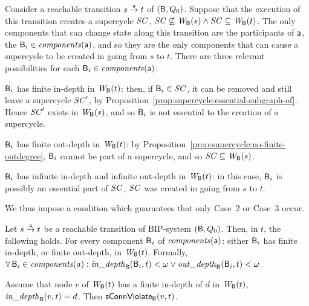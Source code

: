 Consider a reachable transition
$s \la{\act} t$ of $(\B, Q_0)$. Suppose that the execution of 
this transition creates a supercycle $\SC$, \ie $\SC \not\sub \wfg{\B}{s} \land \SC \sub
\wfg{\B}{t}$. The only components that can change state along this
transition are the participants of $\act$, \ie the $\B_i \in \cmps{\act}$, and so
they are the only components that can cause a supercycle to be created
in going from $s$ to $t$.
There are three relevant possibilities for each $\B_i \in \cmps{\act}$:
\bdn

\item[Case 1] \label{case:finite-in}
$\B_i$ has finite in-depth in $\wfg{\B}{t}$: then, if $\B_i \in
\SC$, it can be removed and still leave a supercycle $\SC'$, by
Proposition~\ref{prop:supercycle:essential-subgraph-of}. Hence 
$\SC'$ exists in $\wfg{\B}{s}$, and so 
$\B_i$ is not essential to the creation of a supercycle.

\item[Case 2] \label{case:finite-out}
$\B_i$ has finite out-depth in $\wfg{\B}{t}$: 
by Proposition~\ref{prop:supercycle:no-finite-outdegree}, 
$\B_i$ cannot be part of a supercycle, and so $\SC \sub \wfg{\B}{s}$.

\item[Case 3] \label{case:infinite-both}
$\B_i$ has infinite in-depth and infinite out-depth in
$\wfg{\B}{t}$: in this case, $\B_i$ is possibly an essential part of
$\SC$, \ie $\SC$ was created in going from $s$ to $t$.

\edn
We thus impose a condition which guarantees that only 
Case~2 %
or Case~3 %
occur. 



\bd[$\GLin(\act)$] \label{def:global:dfc}
Let $s \goesto[\act] t$ be a reachable transition of BIP-system $(\B, Q_0)$.
Then, in $t$, the following holds. 
For every component $\B_i$ of $\cmps{\act}$:  either $\B_i$ has finite in-depth,
or finite out-depth, in $\wfg{\B}{t}$.
Formally,\\
\ind  $\fa \B_i \in \cmps{a}: \widepth{\B}{\B_i}{t} < \omega \lor \wodepth{\B}{\B_i}{t} < \omega$.
\ed



\bp \label{prop:indepth-finite-implies-scViol}
Assume that node $v$ of $\wfg{\B}{t}$ has a finite in-depth of $d$ in $\wfg{\B}{t}$, \ie 
$\widepth{\B}{v}{t} = d$. Then $\connViol{v}{t}$.
\ep
%



